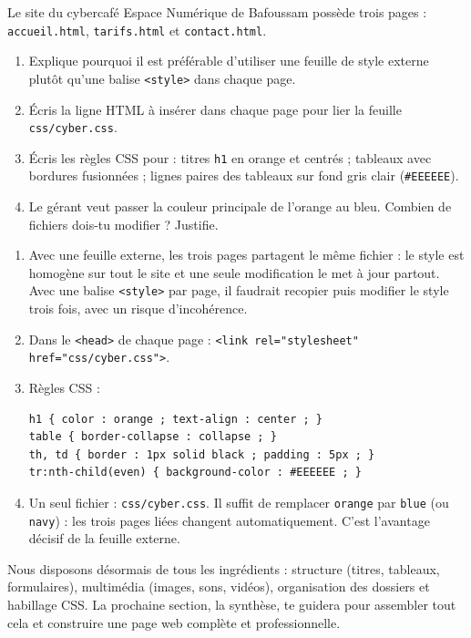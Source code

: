 \documentclass[11pt]{article}
\begin{document}
\begin{exercice}
Le site du cybercafé \og Espace Numérique \fg de Bafoussam possède trois pages : \texttt{accueil.html}, \texttt{tarifs.html} et \texttt{contact.html}.
\begin{enumerate}
\item Explique pourquoi il est préférable d'utiliser une feuille de style externe plutôt qu'une balise \texttt{<style>} dans chaque page.
\item Écris la ligne HTML à insérer dans chaque page pour lier la feuille \texttt{css/cyber.css}.
\item Écris les règles CSS pour : titres \texttt{h1} en orange et centrés ; tableaux avec bordures fusionnées ; lignes paires des tableaux sur fond gris clair (\texttt{\#EEEEEE}).
\item Le gérant veut passer la couleur principale de l'orange au bleu. Combien de fichiers dois-tu modifier ? Justifie.
\end{enumerate}
\end{exercice}

\begin{corrige}
\begin{enumerate}
\item Avec une feuille externe, les trois pages partagent le même fichier : le style est homogène sur tout le site et une seule modification le met à jour partout. Avec une balise \texttt{<style>} par page, il faudrait recopier puis modifier le style trois fois, avec un risque d'incohérence.
\item Dans le \texttt{<head>} de chaque page : \texttt{<link rel="stylesheet" href="css/cyber.css">}.
\item Règles CSS :
\begin{lstlisting}
h1 { color : orange ; text-align : center ; }
table { border-collapse : collapse ; }
th, td { border : 1px solid black ; padding : 5px ; }
tr:nth-child(even) { background-color : #EEEEEE ; }
\end{lstlisting}
\item Un seul fichier : \texttt{css/cyber.css}. Il suffit de remplacer \texttt{orange} par \texttt{blue} (ou \texttt{navy}) : les trois pages liées changent automatiquement. C'est l'avantage décisif de la feuille externe.
\end{enumerate}
\end{corrige}

Nous disposons désormais de tous les ingrédients : structure (titres, tableaux, formulaires), multimédia (images, sons, vidéos), organisation des dossiers et habillage CSS. La prochaine section, la synthèse, te guidera pour assembler tout cela et construire une page web complète et professionnelle.
\end{document}
